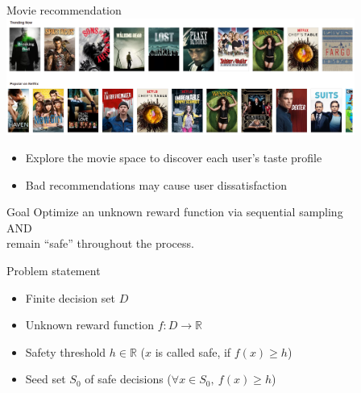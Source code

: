 \documentclass[xetex,10pt,mathserif,handout]{beamer}
\begin{document}
\begin{frame}{Movie recommendation}
\centering
\includegraphics[width=4.5in]{figures/netflix.png}
\vspace{2em}
\begin{itemize}
\item Explore the movie space to discover each user's taste profile
\item Bad recommendations may cause user dissatisfaction
\end{itemize}
\end{frame}

\begin{frame}{Goal}
\centering
\large
Optimize an unknown reward function via sequential sampling\\[1em]
AND\\[1em]
remain ``safe'' throughout the process.
\end{frame}

\begin{frame}{Problem statement}
\begin{itemize}
\item Finite decision set $D$
\vspace{2em}
\item Unknown reward function $f : D \to \mathbb{R}$
\vspace{2em}
\item Safety threshold $h \in \mathbb{R}$ ($x$ is called safe, if $f(x) \geq h$)
\vspace{2em}
\item Seed set $S_0$ of safe decisions ($\forall x \in S_0,\ f(x) \geq h$)
\end{itemize}
\end{frame}
\end{document}
